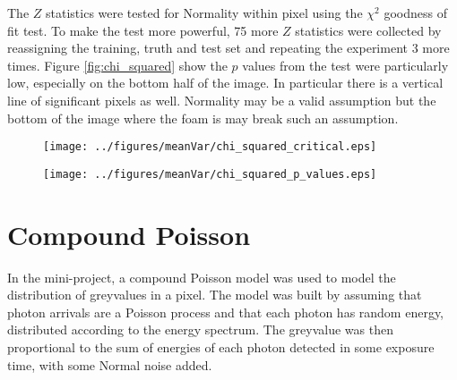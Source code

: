 \documentclass[a4paper]{proc}
\begin{document}
The $Z$ statistics were tested for Normality within pixel using the $\chi^2$ goodness of fit test. To make the test more powerful, 75 more $Z$ statistics were collected by reassigning the training, truth and test set and repeating the experiment 3 more times. Figure \ref{fig:chi_squared} show the $p$ values from the test were particularly low, especially on the bottom half of the image. In particular there is a vertical line of significant pixels as well. Normality may be a valid assumption but the bottom of the image where the foam is may break such an assumption.

\begin{figure*}
	\centering
	\begin{subfigure}{0.45\textwidth}
		\texttt{[image: ../figures/meanVar/chi\_squared\_critical.eps]}
	\end{subfigure}
	\begin{subfigure}{0.45\textwidth}
		\texttt{[image: ../figures/meanVar/chi\_squared\_p\_values.eps]}
	\end{subfigure}
	\caption{$p$ values from the $\chi^2$ goodness of fit test within pixel. Highlighted in red are significant pixels at the $2\sigma$ significant level corrected for multiply testing using the Bonferroni correction.}
	\label{fig:chi_squared}
\end{figure*}

\section{Compound Poisson}
In the mini-project, a compound Poisson model was used to model the distribution of greyvalues in a pixel. The model was built by assuming that photon arrivals are a Poisson process and that each photon has random energy, distributed according to the energy spectrum. The greyvalue was then proportional to the sum of energies of each photon detected in some exposure time, with some Normal noise added.
\end{document}
